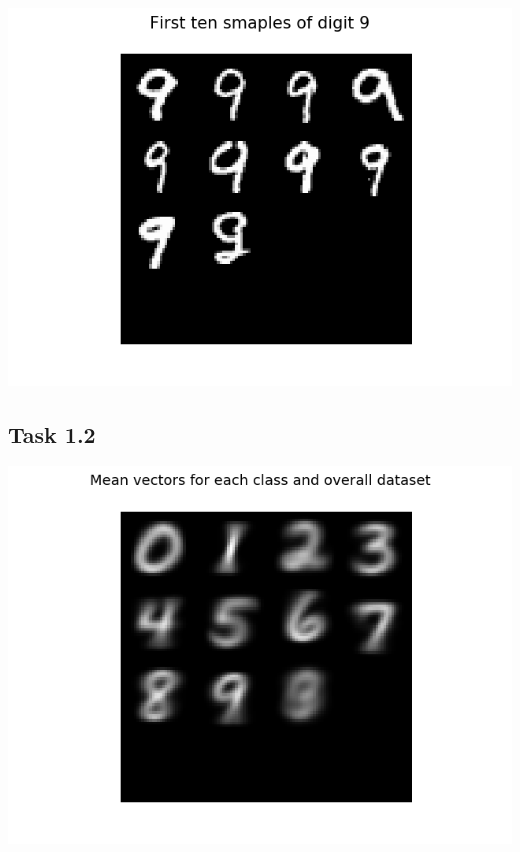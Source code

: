 \documentclass{article}
\begin{document}
    \\
\begin{center}
    \includegraphics[trim=0 0 0 0, scale=0.4]{images/task1_1_imgs_class9.png}
\end{center}

\newpage

\subsection*{Task 1.2}

\begin{center}
    \includegraphics[trim=0 0 0 0, scale=0.55]{images/task1_2_imgs.png}
\end{center}
\end{document}

